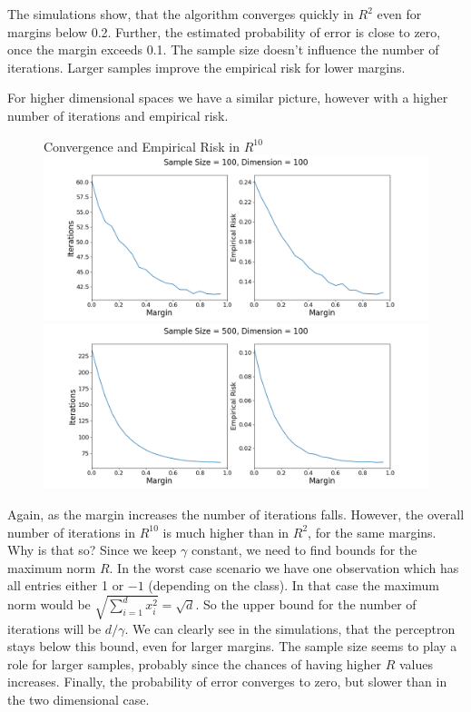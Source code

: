 \documentclass[a4paper, 11pt]{article} %
\begin{document}
The simulations show, that the algorithm converges quickly in $R^2$ even for margins below 0.2. Further, the estimated probability of error is close to zero, once the margin exceeds 0.1. 
The sample size doesn't influence the number of iterations. Larger samples improve the empirical risk for lower margins. 


For higher dimensional spaces we have a similar picture, however with a higher number of iterations and empirical risk.

\begin{figure}[H]
\centering
Convergence and Empirical Risk in $R^{10}$
\includegraphics[scale= 0.4]{Perceptron_Seperable100_d100}
\includegraphics[scale= 0.4]{Perceptron_Seperable500_d100}
\end{figure}

Again, as the margin increases the number of iterations falls. However, the overall number of iterations in $R^{10}$ is much higher than in $R^2$, for the same margins. Why is that so? Since we keep $\gamma$ constant, we need to find bounds for the maximum norm $R$. In the worst case scenario we have one observation which has all entries either 1 or $-1$ (depending on the class). In that case the maximum norm would be $\sqrt{\sum_{i=1}^d x_i^2} = \sqrt{d}$. So the upper bound for the number of iterations will be $d/\gamma$. We can clearly see in the simulations, that the perceptron stays below this bound, even for larger margins. The sample size seems to play a role for larger samples, probably since the chances of having higher $R$ values increases. Finally, the probability of error converges to zero, but slower than in the two dimensional case.
\newpage
\end{document}
